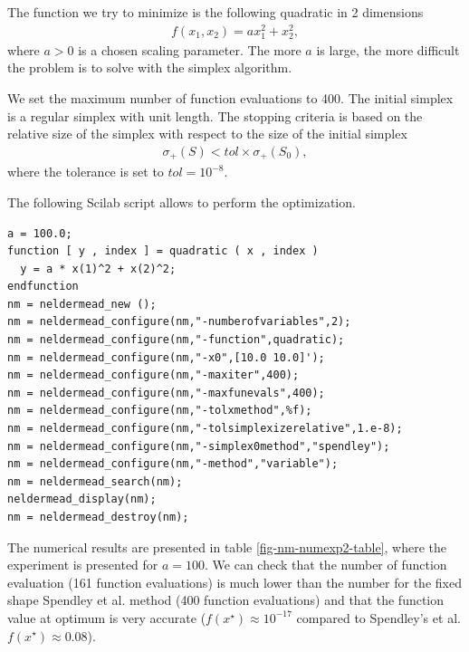 The function we try to minimize is the following quadratic 
in 2 dimensions 
\begin{eqnarray}
\label{quadratic-nm-function2}
f(x_1,x_2) = a x_1^2 + x_2^2,
\end{eqnarray}
where $a>0$ is a chosen scaling parameter. 
The more $a$ is large, the more difficult the problem is 
to solve with the simplex algorithm.

We set the maximum number of function evaluations to 400.
The initial simplex is a regular simplex with unit length.
The stopping criteria is based on the relative size of the simplex 
with respect to the size of the initial simplex 
\begin{eqnarray}
\sigma_+(S) < tol \times \sigma_+(S_0),
\end{eqnarray}
where the tolerance is set to $tol=10^{-8}$.

The following Scilab script allows to perform the optimization.

\lstset{language=scilabscript}
\begin{lstlisting}
a = 100.0;
function [ y , index ] = quadratic ( x , index )
  y = a * x(1)^2 + x(2)^2;
endfunction
nm = neldermead_new ();
nm = neldermead_configure(nm,"-numberofvariables",2);
nm = neldermead_configure(nm,"-function",quadratic);
nm = neldermead_configure(nm,"-x0",[10.0 10.0]');
nm = neldermead_configure(nm,"-maxiter",400);
nm = neldermead_configure(nm,"-maxfunevals",400);
nm = neldermead_configure(nm,"-tolxmethod",%f);
nm = neldermead_configure(nm,"-tolsimplexizerelative",1.e-8);
nm = neldermead_configure(nm,"-simplex0method","spendley");
nm = neldermead_configure(nm,"-method","variable");
nm = neldermead_search(nm);
neldermead_display(nm);
nm = neldermead_destroy(nm);
\end{lstlisting}

The numerical results are presented in table \ref{fig-nm-numexp2-table},
where the experiment is presented for $a=100$. We can check that the 
number of function evaluation (161 function evaluations) is much lower than the number 
for the fixed shape Spendley et al. method (400 function evaluations)
and that the function value at optimum is very accurate ($f(x^\star)\approx 10^{-17}$
compared to Spendley's et al. $f(x^\star) \approx 0.08$).

